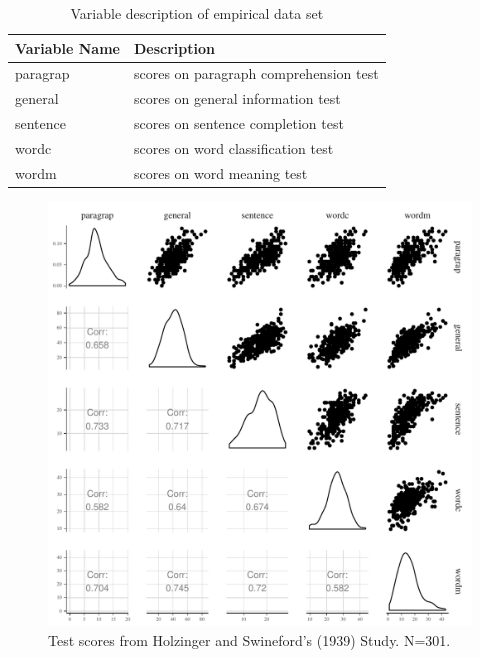\documentclass[11pt,a4paper,twoside]{book}\usepackage[]{graphicx}\usepackage[]{color}
\begin{document}
\begin{table}
\centering
\caption{Variable description of empirical data set}
\begin{tabular}{l l}
  \toprule			
  Variable Name & Description  \\   \midrule  
  paragrap & scores on paragraph comprehension test  \\
  general & scores on general information test \\
  sentence & scores on sentence completion test\\
  wordc & scores on word classification test \\
  wordm & scores on word meaning test \\
  \bottomrule  
\end{tabular}
\label{table:hs.data}
\end{table}

\begin{figure}

{\centering \includegraphics[width=\textwidth-3cm]{figure/ch03_figunnamed-chunk-1-1} 

}

\caption[Test scores from Holzinger and Swineford's  (1939) Study]{Test scores from Holzinger and Swineford's  (1939) Study. N=301.}\label{fig:unnamed-chunk-1}
\end{figure}
\end{document}
